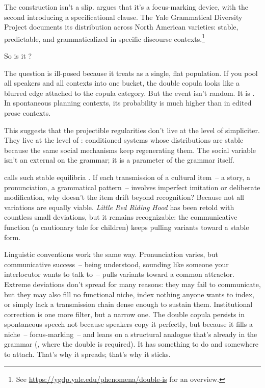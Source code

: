 The construction isn't a slip. \textcite{coppock2018double} argues that it's a focus-marking device, with the second  introducing a specificational clause. The Yale Grammatical Diversity Project documents its distribution across North American varieties: stable, predictable, and grammaticalized in specific discourse contexts.\footnote{See \url{https://ygdp.yale.edu/phenomena/double-is} for an overview.}

So is it ?

The question is ill-posed because it treats  as a single, flat population. If you pool all speakers and all contexts into one bucket, the double copula looks like a blurred edge attached to the copula category. But the event isn't random. It is . In spontaneous planning contexts, its probability is much higher than in edited prose contexts.

This suggests that the projectible regularities don't live at the level of  simpliciter. They live at the level of : conditioned systems whose distributions are stable because the same social mechanisms keep regenerating them. The social variable isn't an external  on the grammar; it is a parameter of the grammar itself.

\textcite{sperber1996} calls such stable equilibria . If each transmission of a cultural item~-- a story, a pronunciation, a grammatical pattern~-- involves imperfect imitation or deliberate modification, why doesn't the item drift beyond recognition? Because not all variations are equally viable. \emph{Little Red Riding Hood} has been retold with countless small deviations, but it remains recognizable: the communicative function (a cautionary tale for children) keeps pulling variants toward a stable form.

Linguistic conventions work the same way. Pronunciation varies, but communicative success~-- being understood, sounding like someone your interlocutor wants to talk to~-- pulls variants toward a common attractor. Extreme deviations don't spread for many reasons: they may fail to communicate, but they may also fill no functional niche, index nothing anyone wants to index, or simply lack a transmission chain dense enough to sustain them. Institutional correction is one more filter, but a narrow one. The double copula persists in spontaneous speech not because speakers copy it perfectly, but because it fills a niche~-- focus-marking~-- and leans on a structural analogue that's already in the grammar (, where the double  is required). It has something to do and somewhere to attach. That's why it spreads; that's why it sticks.

